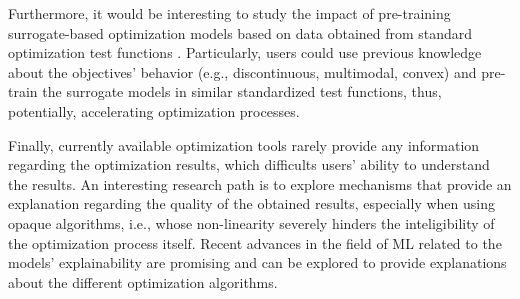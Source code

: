 Furthermore, it would be interesting to study the impact of pre-training surrogate-based optimization models based on data obtained from standard optimization test functions . Particularly, users could use previous knowledge about the objectives' behavior (e.g., discontinuous, multimodal, convex) and pre-train the surrogate models in similar standardized test functions, thus, potentially, accelerating optimization processes. %


Finally, currently available optimization tools rarely provide any information regarding the optimization results, which difficults users' ability to understand the results. An interesting research path is to explore mechanisms that provide an explanation regarding the quality of the obtained results, especially when using opaque algorithms, i.e., whose non-linearity severely hinders the inteligibility of the optimization process itself. Recent advances in the field of \ac{ML} related to the models' explainability are promising and can be explored to provide explanations about the different optimization algorithms. 
	
	
	
	
	
